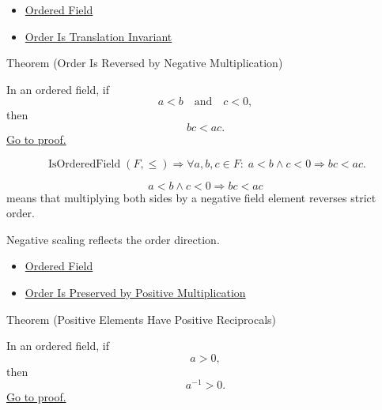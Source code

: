 \begin{dependencies}
\begin{itemize}
  \item \hyperref[def:ordered-field]{Ordered Field}
  \item \hyperref[thm:ordered-field-translation-invariant]{Order Is Translation Invariant}
\end{itemize}
\end{dependencies}

\begin{theorembox}{Theorem (Order Is Reversed by Negative Multiplication)}
\begin{theorem}\label{thm:ordered-field-negative-multiplication-reverses-order}
In an ordered field, if
\[
a<b
\quad\text{and}\quad
c<0,
\]
then
\[
bc<ac.
\]
\hyperref[prf:ordered-field-negative-multiplication-reverses-order]{Go to proof.}
\end{theorem}
\end{theorembox}

\begin{remark*}
\[
\operatorname{IsOrderedField}(F,\leq)
\Longrightarrow
\forall a,b,c\in F{:}\; a<b\land c<0 \Longrightarrow bc<ac.
\]
\end{remark*}

\begin{remark*}
\[
a<b\land c<0
\Longrightarrow
bc<ac
\]
means that multiplying both sides by a negative field element reverses strict
order.
\end{remark*}

\begin{remark*}[Interpretation]
Negative scaling reflects the order direction.
\end{remark*}

\begin{dependencies}
\begin{itemize}
  \item \hyperref[def:ordered-field]{Ordered Field}
  \item \hyperref[thm:ordered-field-positive-multiplication-preserves-order]{Order Is Preserved by Positive Multiplication}
\end{itemize}
\end{dependencies}

\begin{theorembox}{Theorem (Positive Elements Have Positive Reciprocals)}
\begin{theorem}\label{thm:ordered-field-positive-reciprocals}
In an ordered field, if
\[
a>0,
\]
then
\[
a^{-1}>0.
\]
\hyperref[prf:ordered-field-positive-reciprocals]{Go to proof.}
\end{theorem}
\end{theorembox}

